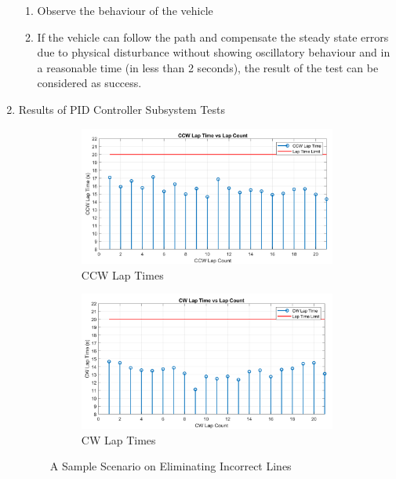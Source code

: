 \documentclass[a4paper,12pt]{article}
\begin{document}
\begin{enumerate}
\begin{enumerate}
\item Observe the behaviour of the vehicle  

\item If the vehicle can follow the path and compensate the steady state errors due to physical disturbance without showing oscillatory behaviour and in a reasonable time (in less than 2 seconds), the result of the test can be considered as success.  

\end{enumerate}





\item{Results of PID Controller Subsystem Tests}

	\begin{figure}[t!]
		\setlength{\unitlength}{\textwidth} 
		\centering
			\begin{subfigure}{.46\textwidth}
			\centering
			\includegraphics[width=0.44\unitlength]{images/ROT_ROI/ccwLapTime_crop}
			\caption{\label{fig:ccwLapTime} CCW Lap Times}
		\end{subfigure}%
		\begin{subfigure}{.46\textwidth}
			\centering
			\includegraphics[width=0.44\unitlength]{images/ROT_ROI/cwLapTime_crop}
			\caption{\label{fig:cwLapTime} CW Lap Times}
		\end{subfigure}
		\caption{\label{fig:LapTimes} A Sample Scenario on Eliminating Incorrect Lines}
	\end{figure}


\end{enumerate}
\end{document}
